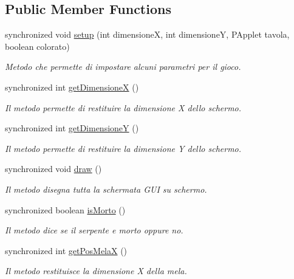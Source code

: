 \subsection*{Public Member Functions}
\begin{DoxyCompactItemize}
\item 
synchronized void \mbox{\hyperlink{class_snake_1_1game_1_1gioco_a3b1654da86fa1fa7edeeb31ef7b6c7c8}{setup}} (int dimensioneX, int dimensioneY, P\+Applet tavola, boolean colorato)
\begin{DoxyCompactList}\small\item\em Metodo che permette di impostare alcuni parametri per il gioco. \end{DoxyCompactList}\item 
synchronized int \mbox{\hyperlink{class_snake_1_1game_1_1gioco_ad74e7d47d7a1a055b993ccebbc684c08}{get\+DimensioneX}} ()
\begin{DoxyCompactList}\small\item\em Il metodo permette di restituire la dimensione X dello schermo. \end{DoxyCompactList}\item 
synchronized int \mbox{\hyperlink{class_snake_1_1game_1_1gioco_abd35efad25c3e2eb4a53c1a7e2b11d71}{get\+DimensioneY}} ()
\begin{DoxyCompactList}\small\item\em Il metodo permette di restituire la dimensione Y dello schermo. \end{DoxyCompactList}\item 
synchronized void \mbox{\hyperlink{class_snake_1_1game_1_1gioco_a4262ff48c6fe3e20a0e3c9295158e375}{draw}} ()
\begin{DoxyCompactList}\small\item\em Il metodo disegna tutta la schermata G\+UI su schermo. \end{DoxyCompactList}\item 
synchronized boolean \mbox{\hyperlink{class_snake_1_1game_1_1gioco_a4bfdf00a78db51587515ac33ff8b6640}{is\+Morto}} ()
\begin{DoxyCompactList}\small\item\em Il metodo dice se il serpente e\textquotesingle{} morto oppure no. \end{DoxyCompactList}\item 
synchronized int \mbox{\hyperlink{class_snake_1_1game_1_1gioco_a64c70d61c15e0cb706c686ddfa016f4e}{get\+Pos\+MelaX}} ()
\begin{DoxyCompactList}\small\item\em Il metodo restituisce la dimensione X della mela. \end{DoxyCompactList}\item 

\end{DoxyCompactItemize}
